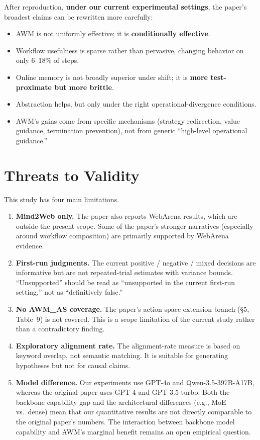 \documentclass{article}
\providecommand{\tightlist}{%
  \setlength{\itemsep}{0pt}\setlength{\parskip}{0.8em}}
\begin{document}
After reproduction, \textbf{under our current experimental settings},
the paper's broadest claims can be rewritten more carefully:

\begin{itemize}
\tightlist
\item
  AWM is not uniformly effective; it is \textbf{conditionally
  effective}.
\item
  Workflow usefulness is sparse rather than pervasive, changing behavior
  on only 6--18\% of steps.
\item
  Online memory is not broadly superior under shift; it is \textbf{more
  test-proximate but more brittle}.
\item
  Abstraction helps, but only under the right operational-divergence
  conditions.
\item
  AWM's gains come from specific mechanisms (strategy redirection, value
  guidance, termination prevention), not from generic ``high-level
  operational guidance.''
\end{itemize}

\section{Threats to Validity}\label{threats-to-validity}

This study has four main limitations.

\begin{enumerate}
\def\labelenumi{\arabic{enumi}.}
\item
  \textbf{Mind2Web only.} The paper also reports WebArena results, which
  are outside the present scope. Some of the paper's stronger narratives
  (especially around workflow composition) are primarily supported by
  WebArena evidence.
\item
  \textbf{First-run judgments.} The current positive / negative / mixed
  decisions are informative but are not repeated-trial estimates with
  variance bounds. ``Unsupported'' should be read as ``unsupported in
  the current first-run setting,'' not as ``definitively false.''
\item
  \textbf{No AWM\_AS coverage.} The paper's action-space extension
  branch (§5, Table~9) is not covered. This is a scope limitation of
  the current study rather than a contradictory finding.
\item
  \textbf{Exploratory alignment rate.} The alignment-rate measure is
  based on keyword overlap, not semantic matching. It is suitable for
  generating hypotheses but not for causal claims.
\item
  \textbf{Model difference.} Our experiments use GPT-4o and
  Qwen-3.5-397B-A17B, whereas the original paper uses GPT-4 and
  GPT-3.5-turbo. Both the backbone capability gap and the architectural
  differences (e.g., MoE vs.\ dense) mean that our quantitative results
  are not directly comparable to the original paper's numbers. The
  interaction between backbone model capability and AWM's marginal
  benefit remains an open empirical question.
\end{enumerate}
\end{document}
